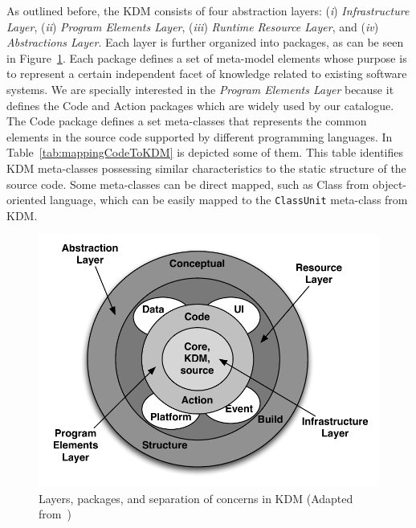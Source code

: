 \documentclass[12pt]{article}
\let\cite=\citep
\begin{document}
As outlined before, the KDM consists of four abstraction layers: (\textit{i}) \emph{Infrastructure Layer}, (\textit{ii}) \emph{Program Elements Layer}, (\textit{iii}) \emph{Runtime Resource Layer}, and (\textit{iv}) \emph{Abstractions Layer}. Each layer is further organized into packages, as can be seen in Figure~\ref{fig:layersKDM}. Each package defines a set of meta-model elements whose purpose is to represent a certain independent facet of knowledge related to existing software systems.  We are specially interested in the \textit{Program Elements Layer} because it defines the Code and Action packages which are widely used by our catalogue. The Code package defines a set meta-classes that represents the common elements in the source code supported by different programming languages. In Table~\ref{tab:mappingCodeToKDM} is depicted some of them. This table identifies KDM meta-classes possessing similar characteristics to the static structure of the source code. Some meta-classes can be direct mapped, such as Class from object-oriented language, which can be easily mapped to the \texttt{ClassUnit} meta-class from KDM.

\begin{figure}[t]
\centering
  \includegraphics[scale=0.55]{Figure/Layers_packages_and_separations_of_concerns_in_KDM}
\caption{Layers, packages, and separation of concerns in KDM (Adapted from~\cite{OMGADM})}
\label{fig:layersKDM}
\end{figure}
\end{document}
